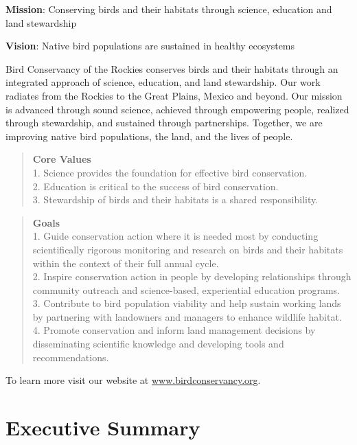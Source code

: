 \documentclass[
  letterpaper,
  DIV=11,
  numbers=noendperiod,
  oneside]{scrreprt}
\begin{document}
\textbf{Mission}: Conserving birds and their habitats through science,
education and land stewardship

\textbf{Vision}: Native bird populations are sustained in healthy
ecosystems

Bird Conservancy of the Rockies conserves birds and their habitats
through an integrated approach of science, education, and land
stewardship. Our work radiates from the Rockies to the Great Plains,
Mexico and beyond. Our mission is advanced through sound science,
achieved through empowering people, realized through stewardship, and
sustained through partnerships. Together, we are improving native bird
populations, the land, and the lives of people.

\begin{quote}
\textbf{Core Values}\\
1. Science provides the foundation for effective bird conservation.\\
2. Education is critical to the success of bird conservation.\\
3. Stewardship of birds and their habitats is a shared responsibility.
\end{quote}

\begin{quote}
\textbf{Goals}\\
1. Guide conservation action where it is needed most by conducting
scientifically rigorous monitoring and research on birds and their
habitats within the context of their full annual cycle.\\
2. Inspire conservation action in people by developing relationships
through community outreach and science-based, experiential education
programs.\\
3. Contribute to bird population viability and help sustain working
lands by partnering with landowners and managers to enhance wildlife
habitat.\\
4. Promote conservation and inform land management decisions by
disseminating scientific knowledge and developing tools and
recommendations.
\end{quote}

To learn more visit our website at
\href{https://birdconservancy.org}{www.birdconservancy.org}.


\hypertarget{executive-summary}{%
\chapter{Executive Summary}\label{executive-summary}}
\end{document}
